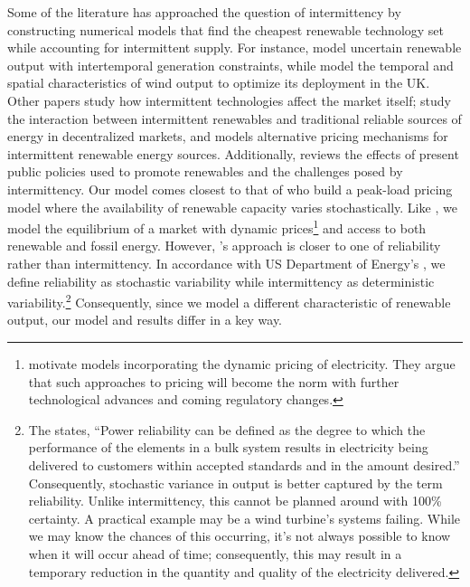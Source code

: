 \documentclass[11pt,a4paper,leqno]{extarticle}
\begin{document}
	Some of the literature has approached the question of intermittency by constructing numerical models that find the cheapest renewable technology set while accounting for intermittent supply. For instance, \citet{MN2006} model uncertain renewable output with intertemporal generation constraints, while \citet{NCK2007} model the temporal and spatial characteristics of wind output to optimize its deployment in the UK. Other papers study how intermittent technologies affect the market itself; \citet{AC2012} study the interaction between intermittent renewables and traditional reliable sources of energy in decentralized markets, and \citet{Chao2011} models alternative pricing mechanisms for intermittent renewable energy sources. Additionally, \citet{Boren2012} reviews the effects of present public policies used to promote renewables and the challenges posed by intermittency. Our model comes closest to that of \citet{HH} who build a peak-load pricing model where the availability of renewable capacity varies stochastically. Like \citeauthor{HH}, we model the  equilibrium of a market with dynamic prices\footnote{ \citeauthor{HH} motivate models incorporating the dynamic pricing of electricity. They argue that such approaches to pricing will become the norm with further technological advances and coming regulatory changes.} and access to both renewable and fossil energy. However,  \citeauthor{HH}'s approach  is closer to one of reliability rather than intermittency. In accordance with US Department of Energy's \citet{ORNL}, we define reliability as stochastic variability while intermittency as deterministic variability.\footnote{ 
		The \citeauthor{ORNL} states, ``Power reliability can be defined as the degree to which the performance of the elements in a bulk system results in electricity being delivered to customers within accepted standards and in the amount desired.'' Consequently, stochastic variance in output is better captured by the term  reliability.  Unlike intermittency, this cannot be planned around with 100\% certainty. A practical example may be a wind turbine's systems failing. While we may know the chances of this occurring, it's not always possible to know when it will occur ahead of time; consequently, this may result in a temporary reduction in the quantity and quality of the electricity delivered. 
	} Consequently, since we model a different characteristic of renewable output, our model and results differ in a key way. 
	
\end{document}
